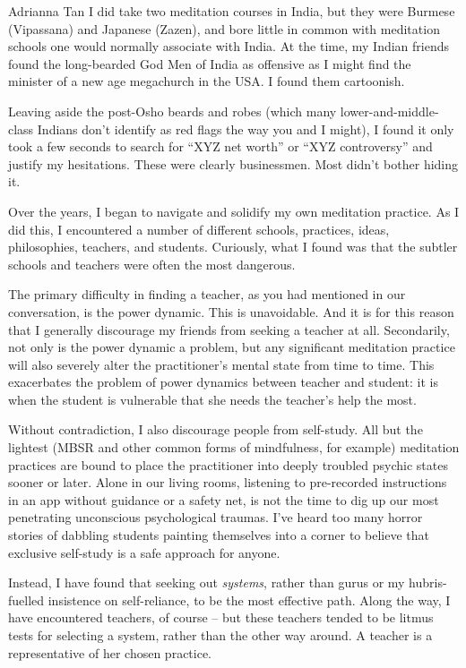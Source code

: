 \documentclass{letter}
\newcommand\hr{\par\vspace{-.5\ht\strutbox}\noindent\hrulefill\par}
\begin{document}
\begin{letter}{Adrianna Tan}
I did take two meditation courses in India, but they were Burmese (Vipassana) and Japanese (Zazen), and bore little in common with meditation schools one would normally associate with India.
At the time, my Indian friends found the long-bearded God Men of India as offensive as I might find the minister of a new age megachurch in the USA.
I found them cartoonish.

Leaving aside the post-Osho beards and robes (which many lower-and-middle-class Indians don't identify as red flags the way you and I might), I found it only took a few seconds to search for ``XYZ net worth'' or ``XYZ controversy'' and justify my hesitations.
These were clearly businessmen.
Most didn't bother hiding it.

Over the years, I began to navigate and solidify my own meditation practice.
As I did this, I encountered a number of different schools, practices, ideas, philosophies, teachers, and students.
Curiously, what I found was that the subtler schools and teachers were often the most dangerous.

\hr

The primary difficulty in finding a teacher, as you had mentioned in our conversation, is the power dynamic.
This is unavoidable.
And it is for this reason that I generally discourage my friends from seeking a teacher at all.
Secondarily, not only is the power dynamic a problem, but any significant meditation practice will also severely alter the practitioner's mental state from time to time.
This exacerbates the problem of power dynamics between teacher and student: it is when the student is vulnerable that she needs the teacher's help the most.

Without contradiction, I also discourage people from self-study.
All but the lightest (MBSR and other common forms of mindfulness, for example) meditation practices are bound to place the practitioner into deeply troubled psychic states sooner or later.
Alone in our living rooms, listening to pre-recorded instructions in an app without guidance or a safety net, is not the time to dig up our most penetrating unconscious psychological traumas.
I've heard too many horror stories of dabbling students painting themselves into a corner to believe that exclusive self-study is a safe approach for anyone.

Instead, I have found that seeking out \textit{systems}, rather than gurus or my hubris-fuelled insistence on self-reliance, to be the most effective path.
Along the way, I have encountered teachers, of course -- but these teachers tended to be litmus tests for selecting a system, rather than the other way around.
A teacher is a representative of her chosen practice.


\end{letter}
\end{document}

